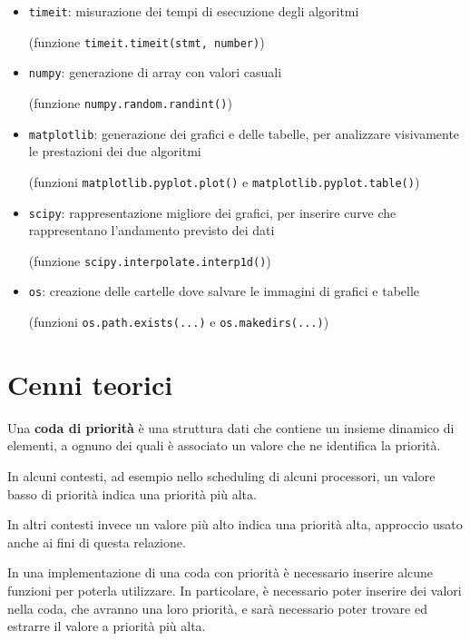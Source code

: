 \documentclass{article}
\begin{document}
\begin{itemize}
    \item \verb|timeit|: misurazione dei tempi di esecuzione degli algoritmi
    \par (funzione \verb|timeit.timeit(stmt, number)|)
    
    \item \verb|numpy|: generazione di array con valori casuali
    \par (funzione \verb|numpy.random.randint()|)
    
    \item \verb|matplotlib|: generazione dei grafici e delle tabelle, per analizzare visivamente le prestazioni dei due algoritmi
    \par (funzioni \verb|matplotlib.pyplot.plot()| e \verb|matplotlib.pyplot.table()|)
    
    \item \verb|scipy|: rappresentazione migliore dei grafici, per inserire curve che rappresentano l'andamento previsto dei dati
    \par(funzione \verb|scipy.interpolate.interp1d()|)
    
    \item \verb|os|: creazione delle cartelle dove salvare le immagini di grafici e tabelle
    \par (funzioni \verb|os.path.exists(...)| e \verb|os.makedirs(...)|)
\end{itemize}

\clearpage
\section{Cenni teorici}

Una \textbf{coda di priorità} è una struttura dati che contiene un insieme dinamico di elementi, a ognuno dei quali è associato un valore che ne identifica la priorità.

\vspace{5pt}
In alcuni contesti, ad esempio nello scheduling di alcuni processori, un valore basso di priorità indica una priorità più alta.

In altri contesti invece un valore più alto indica una priorità alta, approccio usato anche ai fini di questa relazione.

\vspace{5pt}
In una implementazione di una coda con priorità è necessario inserire alcune funzioni per poterla utilizzare. In particolare, è necessario poter inserire dei valori nella coda, che avranno una loro priorità, e sarà necessario poter trovare ed estrarre il valore a priorità più alta.
\end{document}

